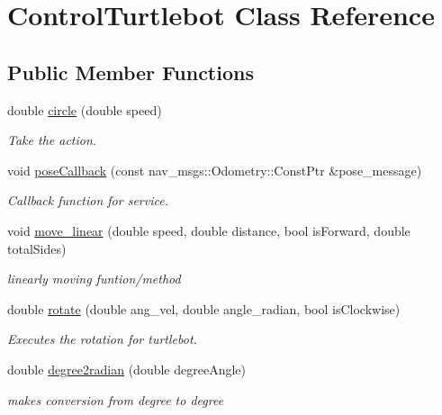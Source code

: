 \hypertarget{class_control_turtlebot}{}\section{Control\+Turtlebot Class Reference}
\label{class_control_turtlebot}
\subsection*{Public Member Functions}
\begin{DoxyCompactItemize}
\item 
double \hyperlink{class_control_turtlebot_a000b59ff871ccee120ea9ad36a24922a}{circle} (double speed)
\begin{DoxyCompactList}\small\item\em Take the action. \end{DoxyCompactList}\item 
void \hyperlink{class_control_turtlebot_abca7a1b114375081608e8e17edebaf22}{pose\+Callback} (const nav\+\_\+msgs\+::\+Odometry\+::\+Const\+Ptr \&pose\+\_\+message)
\begin{DoxyCompactList}\small\item\em Callback function for service. \end{DoxyCompactList}\item 
void \hyperlink{class_control_turtlebot_a71259921f0318cea8ce13838eef9402e}{move\+\_\+linear} (double speed, double distance, bool is\+Forward, double total\+Sides)
\begin{DoxyCompactList}\small\item\em linearly moving funtion/method \end{DoxyCompactList}\item 
double \hyperlink{class_control_turtlebot_a0c5c4a568758d3165e7f275d0f666afb}{rotate} (double ang\+\_\+vel, double angle\+\_\+radian, bool is\+Clockwise)
\begin{DoxyCompactList}\small\item\em Executes the rotation for turtlebot. \end{DoxyCompactList}\item 
double \hyperlink{class_control_turtlebot_adcb5d2af5d989a8f2088ff13136bfc1a}{degree2radian} (double degree\+Angle)
\begin{DoxyCompactList}\small\item\em makes conversion from degree to degree \end{DoxyCompactList}\item 

\end{DoxyCompactItemize}
